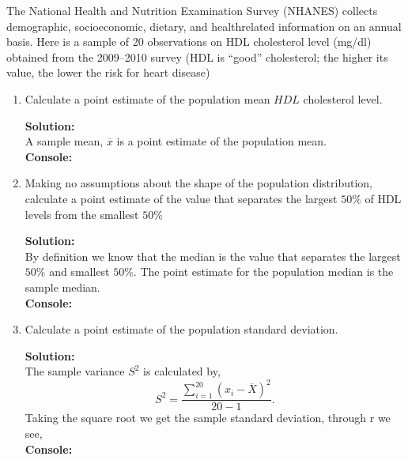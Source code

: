 \documentclass[12pt]{article}
\makeatletter
\theoremstyle{homework}
\newenvironment{exercise}[1]
{\def\@currentlabel{#1}\exercisecore}
{\endexercisecore}
\newcommand{\localhead}[1]{\par\smallskip\noindent\textbf{#1}\nobreak\\}%
\newcommand\solution{\localhead{Solution:}}
\makeatother
\begin{document}
\begin{exercise}{6.2} The National   Health   and   Nutrition   Examination   Survey   (NHANES)   collects 
demographic,   socioeco­nomic,  dietary,  and  health­related  information  on  an  annual  basis.  Here  is  a  
sample  of  20  observations  on  HDL cholesterol level (mg/dl) obtained from the 2009–2010  survey  
(HDL  is  “good”  cholesterol;  the  higher  its  value, the lower the risk for heart disease)\\
\begin{enumerate}
  \item Calculate a point estimate of the population mean $HDL$ cholesterol level.\\ 
  \solution A sample mean, $\overline{x}$ is a point estimate of the population mean.\\
  
  \textbf{Console:}
  \begin{center}
    
  \end{center}
  \vspace{.25in}


  \item Making no assumptions about the shape of the population distribution, calculate a point estimate  
of the value that separates the largest $50\%$ of HDL levels from the smallest $50\%$\\ 
  \solution By definition we know that the median is the value that separates the largest $50\%$ and smallest
  $50\%$. The point estimate for the population median is the sample median.\\
  
  \textbf{Console:}
  \begin{center}
    
  \end{center}



  \item  Calculate a point estimate of the population standard deviation.\\
  
  \solution The sample variance $S^2$ is calculated by,
  \begin{equation*}
    S^2 = \dfrac{\sum_{i = 1}^{20}(x_i - \overline{X})^2}{20 - 1}.
  \end{equation*}
Taking the square root we get the sample standard deviation, through r we see,\\
  
\textbf{Console:}
\begin{center}
  
\end{center}
\vspace{.25in}


\end{enumerate}
\end{exercise}
\end{document}
